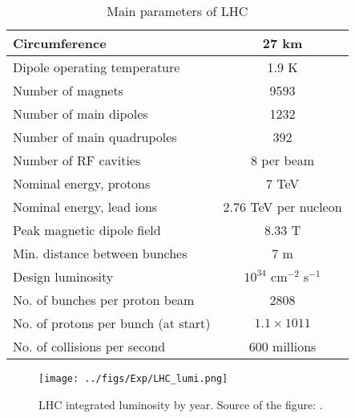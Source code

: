 \begin{table}[h]
  \begin{center}
  \caption{ Main parameters of LHC \cite{ref_LHC_brochure}}
  \vspace{5 mm}
  \begin{tabular}{|l|c|}
     \hline
     Circumference & 27 km  \\ \hline
     Dipole operating temperature &  1.9 K \\ \hline
     Number of magnets &  9593 \\ \hline
     Number of main dipoles &  1232 \\ \hline
     Number of main quadrupoles &  392 \\ \hline
     Number of RF cavities &  8 per beam \\ \hline
     Nominal energy, protons &  7 TeV \\ \hline
     Nominal energy, lead ions &  2.76 TeV per nucleon \\ \hline
     Peak magnetic dipole field &  8.33 T \\ \hline
     Min. distance between bunches &  7 m \\ \hline
     Design luminosity &  $10^{34}$ cm$^{-2}$ s$^{-1}$ \\ \hline
     No. of bunches per proton beam &  2808 \\ \hline
     No. of protons per bunch (at start) &  $1.1\times 10{11}$ \\ \hline
     No. of collisions per second &  600 millions \\ \hline
  \end{tabular}
  \label{tab:LHCparameters}
  \end{center}
 \end{table}

\begin{figure}
  \centering
  \texttt{[image: ../figs/Exp/LHC\_lumi.png]}
  \caption{LHC integrated luminosity by year. Source of the figure: \cite{ref_fig_LHClumi}.}
  \label{fig:LHClumi}
\end{figure}




